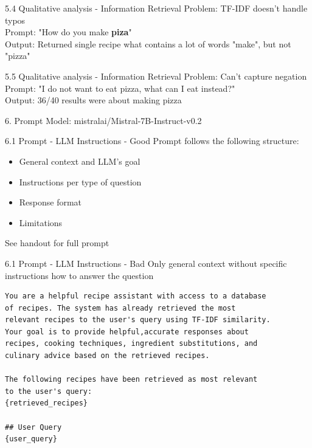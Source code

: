 \documentclass{beamer}
\begin{document}
\begin{frame} {5.4 Qualitative analysis - Information Retrieval}
  Problem: TF-IDF doesn't handle typos\\
  Prompt: "How do you make \textbf{piza}"\\
  Output: Returned single recipe what contains a lot of words "make", but not "pizza"
\end{frame}

\begin{frame} {5.5 Qualitative analysis - Information Retrieval}
  Problem: Can't capture negation\\
  Prompt:  "I do not want to eat pizza, what can I eat instead?"\\
  Output: 36/40 results were about making pizza
\end{frame}

\begin{frame}{6. Prompt}
  Model: mistralai/Mistral-7B-Instruct-v0.2
\end{frame}

\begin{frame}[fragile]{6.1 Prompt - LLM Instructions - Good}
  Prompt follows the following structure:
  \begin{itemize}
    \item General context and LLM's goal
    \item Instructions per type of question
    \item Response format
    \item Limitations
  \end{itemize}

  See handout for full prompt
\end{frame}

\begin{frame}[fragile]{6.1 Prompt - LLM Instructions - Bad}
  Only general context without specific instructions how to answer the question
  \begin{verbatim}
You are a helpful recipe assistant with access to a database
of recipes. The system has already retrieved the most
relevant recipes to the user's query using TF-IDF similarity.
Your goal is to provide helpful,accurate responses about
recipes, cooking techniques, ingredient substitutions, and
culinary advice based on the retrieved recipes.

The following recipes have been retrieved as most relevant
to the user's query:
{retrieved_recipes}

## User Query
{user_query}
\end{verbatim}
\end{frame}
\end{document}
